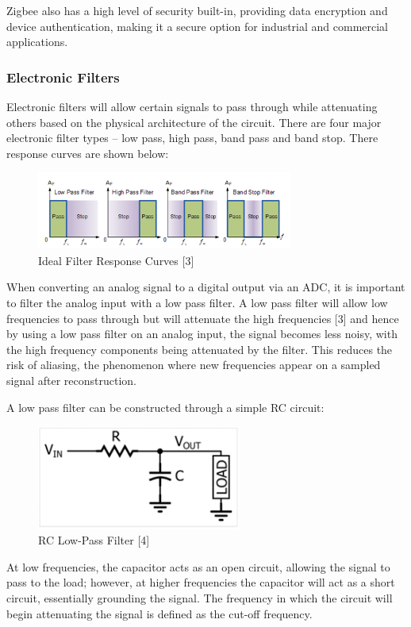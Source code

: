 \documentclass[12pt, a4paper]{article}
\begin{document}
Zigbee also has a high level of security built-in, providing data encryption and device authentication, 
making it a secure option for industrial and commercial applications.

\subsubsection{Electronic Filters}
Electronic filters will allow certain signals to pass through while attenuating others based on the physical architecture of the circuit. 
There are four major electronic filter types – low pass, high pass, band pass and band stop. There response curves are shown below:
\begin{figure}[h]
    \centering
    \includegraphics[width=0.75\textwidth]{filters.png}
    \caption{Ideal Filter Response Curves [3]}
    \label{fig:filter_curves}
\end{figure}
\newline
When converting an analog signal to a digital output via an ADC, it is important to filter the analog input with a 
low pass filter. A low pass filter will allow low frequencies to pass through but will attenuate the high frequencies [3] 
and hence by using a low pass filter on an analog input, the signal becomes less noisy, with the high frequency components 
being attenuated by the filter. This reduces the risk of aliasing, the phenomenon where new frequencies appear on a sampled signal after reconstruction.  

A low pass filter can be constructed through a simple RC circuit:
\begin{figure}[h]
    \centering
    \includegraphics[width=0.6\textwidth]{rc cct.png}
    \caption{RC Low-Pass Filter [4]}
    \label{fig:rc_cct}
\end{figure}
\newline
At low frequencies, the capacitor acts as an open circuit, allowing the signal to pass to the load; however, 
at higher frequencies the capacitor will act as a short circuit, essentially grounding the signal. The frequency 
in which the circuit will begin attenuating the signal is defined as the cut-off frequency.
\end{document}

